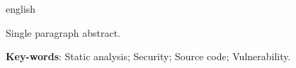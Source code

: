 \begin{resumo}[Abstract]
 \begin{otherlanguage*}{english}

   Single paragraph abstract.

   \vspace{\onelineskip}
 
   \noindent 
   \textbf{Key-words}: Static analysis; Security; Source code; Vulnerability.
 \end{otherlanguage*}
\end{resumo}

